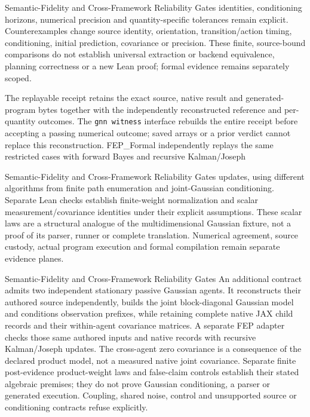 \documentclass[
  ignorenonframetext,
]{beamer}
\begin{document}
\begin{frame}{Semantic-Fidelity and
Cross-Framework Reliability Gates}
identities, conditioning horizons, numerical precision and
quantity-specific tolerances remain explicit. Counterexamples change
source identity, orientation, transition/action timing, conditioning,
initial prediction, covariance or precision. These finite, source-bound
comparisons do not establish universal extraction or backend
equivalence, planning correctness or a new Lean proof; formal evidence
remains separately scoped.

The replayable  receipt retains the
exact source, native result and generated-program bytes together with
the independently reconstructed reference and per-quantity outcomes. The
\texttt{gnn\ witness} interface rebuilds the entire receipt before
accepting a passing numerical outcome; saved arrays or a prior verdict
cannot replace this reconstruction. FEP\_Formal independently replays
the same restricted cases with forward Bayes and recursive Kalman/Joseph
\end{frame}

\begin{frame}{Semantic-Fidelity and
Cross-Framework Reliability Gates}
updates, using different algorithms from finite path enumeration and
joint-Gaussian conditioning. Separate Lean checks establish
finite-weight normalization and scalar measurement/covariance identities
under their explicit assumptions. These scalar laws are a structural
analogue of the multidimensional Gaussian fixture, not a proof of its
parser, runner or complete translation. Numerical agreement, source
custody, actual program execution and formal compilation remain separate
evidence planes.

\end{frame}

\begin{frame}{Semantic-Fidelity and
Cross-Framework Reliability Gates}
An additional  contract admits two
independent stationary passive Gaussian agents. It reconstructs their
authored source independently, builds the joint block-diagonal Gaussian
model and conditions observation prefixes, while retaining complete
native JAX child records and their within-agent covariance matrices. A
separate FEP adapter checks those same authored inputs and native
records with recursive Kalman/Joseph updates. The cross-agent zero
covariance is a consequence of the declared product model, not a
measured native joint covariance. Separate finite post-evidence
product-weight laws and false-claim controls establish their stated
algebraic premises; they do not prove Gaussian conditioning, a parser or
generated execution. Coupling, shared noise, control and unsupported
source or conditioning contracts refuse explicitly.

\end{frame}
\end{document}
